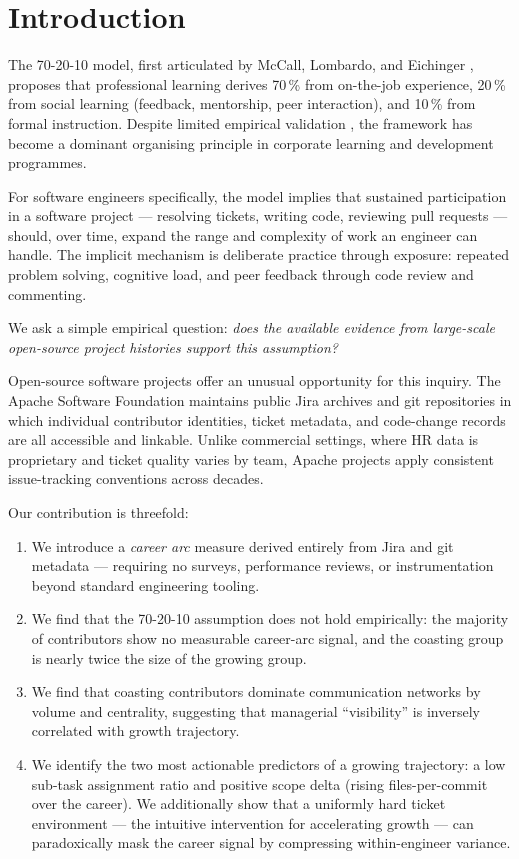 \documentclass[12pt,a4paper]{article}
\begin{document}
\newpage
\tableofcontents
\newpage

\section{Introduction}

The 70-20-10 model, first articulated by McCall, Lombardo, and
Eichinger \citep{McCall1988}, proposes that professional learning
derives 70\,\% from on-the-job experience, 20\,\% from social
learning (feedback, mentorship, peer interaction), and 10\,\% from
formal instruction. Despite limited empirical validation
\citep{Clardy2018}, the framework has become a dominant organising
principle in corporate learning and development programmes.

For software engineers specifically, the model implies that sustained
participation in a software project --- resolving tickets, writing
code, reviewing pull requests --- should, over time, expand the
range and complexity of work an engineer can handle. The implicit
mechanism is deliberate practice through exposure: repeated problem
solving, cognitive load, and peer feedback through code review and
commenting.

We ask a simple empirical question: \textit{does the available
evidence from large-scale open-source project histories support this
assumption?}

Open-source software projects offer an unusual opportunity for
this inquiry. The Apache Software Foundation maintains public Jira
archives and git repositories in which individual contributor
identities, ticket metadata, and code-change records are all
accessible and linkable. Unlike commercial settings, where HR data
is proprietary and ticket quality varies by team, Apache projects
apply consistent issue-tracking conventions across decades.

Our contribution is threefold:
\begin{enumerate}
  \item We introduce a \textit{career arc} measure derived entirely
    from Jira and git metadata --- requiring no surveys, performance
    reviews, or instrumentation beyond standard engineering tooling.
  \item We find that the 70-20-10 assumption does not hold empirically:
    the majority of contributors show no measurable career-arc signal,
    and the coasting group is nearly twice the size of the growing group.
  \item We find that coasting contributors dominate communication
    networks by volume and centrality, suggesting that managerial
    ``visibility'' is inversely correlated with growth trajectory.
  \item We identify the two most actionable predictors of a growing
    trajectory: a low sub-task assignment ratio and positive scope
    delta (rising files-per-commit over the career).
    We additionally show that a uniformly hard ticket environment
    --- the intuitive intervention for accelerating growth --- can
    paradoxically mask the career signal by compressing within-engineer
    variance.
\end{enumerate}
\end{document}
